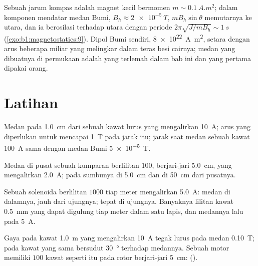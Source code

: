 \begin{example}\label{ex:b1:magnetostatics:compass}
Sebuah jarum kompas adalah magnet kecil bermomen $m \sim \qty{0.1}{A.m^2}$; dalam
komponen mendatar medan Bumi, $B_h \approx \qty{2e-5}{T}$,
 $mB_h\sin\theta$ memutarnya ke utara, dan ia berosilasi terhadap utara dengan
periode $2\pi\sqrt{J/mB_h} \sim \qty{1}{s}$ (\cref{exo:b1:magnetostatics:9}).
Dipol Bumi sendiri, \qty{8e22}{A.m^2}, setara dengan arus
beberapa miliar  yang melingkar dalam teras besi cairnya; medan yang
dibuatnya di permukaan adalah yang terlemah dalam bab ini dan yang pertama
dipakai orang.
\end{example}

\section{Latihan}

\begin{exercise}[$\star$]\label{exo:b1:magnetostatics:1}
Medan pada \qty{1.0}{cm} dari sebuah kawat lurus yang mengalirkan \qty{10}{A}; arus
yang diperlukan untuk mencapai \qty{1}{T} pada jarak itu; jarak saat medan sebuah
kawat \qty{100}{A} sama dengan medan Bumi \qty{5e-5}{T}.
\end{exercise}

\begin{exercise}[$\star$]\label{exo:b1:magnetostatics:2}
Medan di pusat sebuah kumparan berlilitan $100$, berjari-jari \qty{5.0}{cm},
yang mengalirkan \qty{2.0}{A}; pada sumbunya di \qty{5.0}{cm} dan di \qty{50}{cm}
dari pusatnya.
\end{exercise}

\begin{exercise}[$\star$]\label{exo:b1:magnetostatics:3}
Sebuah solenoida berlilitan $1000$ tiap meter mengalirkan \qty{5.0}{A}: medan di dalamnya,
jauh dari ujungnya; tepat di ujungnya. Banyaknya lilitan kawat \qty{0.5}{mm}
yang dapat digulung tiap meter dalam satu lapis, dan medannya lalu pada
\qty{5}{A}.
\end{exercise}

\begin{exercise}[$\star$]\label{exo:b1:magnetostatics:4}
Gaya pada kawat \qty{1.0}{m} yang mengalirkan \qty{10}{A} tegak lurus pada
medan \qty{0.10}{T}; pada kawat yang sama bersudut \qty{30}{\degree} terhadap medannya.
Sebuah motor memiliki $100$ kawat seperti itu pada rotor berjari-jari \qty{5}{cm}:  ().
\end{exercise}


